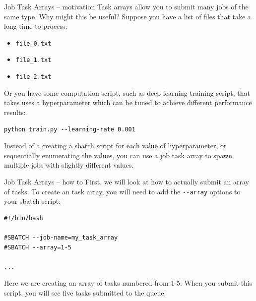 \documentclass[10pt]{beamer}
\begin{document}
\begin{frame}[label={sec:org14fdc4f},fragile]{Job Task Arrays -- motivation}
 Task arrays allow you to submit many jobs of the same type. Why might this be
useful? Suppose you have a list of files that take a long time to process:

\begin{itemize}
\item \texttt{file\_0.txt}
\item \texttt{file\_1.txt}
\item \texttt{file\_2.txt}
\end{itemize}

Or you have some computation script, such as deep learning training script, that
takes uses a hyperparameter which can be tuned to achieve different performance
results:

\begin{verbatim}
python train.py --learning-rate 0.001
\end{verbatim}

Instead of a creating a sbatch script for each value of hyperparameter, or
sequentially enumerating the values, you can use a job task array to spawn
multiple jobs with slightly different values.
\end{frame}

\begin{frame}[label={sec:org75a9174},fragile]{Job Task Arrays -- how to}
 First, we will look at how to actually submit an array of tasks. To create an
task array, you will need to add the \texttt{-{}-array} options to your sbatch script:

\begin{verbatim}
#!/bin/bash

#SBATCH --job-name=my_task_array
#SBATCH --array=1-5

...
\end{verbatim}

Here we are creating an array of tasks numbered from 1-5. When you submit this
script, you will see five tasks submitted to the queue.
\end{frame}
\end{document}
